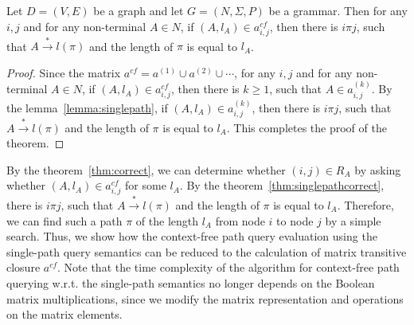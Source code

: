 \begin{mytheorem}\label{thm:singlepathcorrect}
	Let $D = (V,E)$ be a graph and let $G =(N,\Sigma,P)$ be a grammar. Then for any $i, j$ and for any non-terminal $A \in N$, if $(A, l_A) \in a^{cf}_{i,j}$, then there is $i \pi j$, such that $A \xrightarrow{*} l(\pi)$ and the length of $\pi$ is equal to $l_A$.
\end{mytheorem}
\begin{proof}
	
	Since the matrix $a^{cf} = a^{(1)} \cup a^{(2)} \cup \cdots$, for any $i, j$ and for any non-terminal $A \in N$, if $(A, l_A) \in a^{cf}_{i,j}$, then there is $k \geq 1$, such that $A \in a^{(k)}_{i,j}$. By the lemma~\ref{lemma:singlepath}, if $(A, l_A) \in a^{(k)}_{i,j}$, then there is $i \pi j$, such that $A \xrightarrow{*} l(\pi)$ and the length of $\pi$ is equal to $l_A$. This completes the proof of the theorem.
\end{proof}

By the theorem~\ref{thm:correct}, we can determine whether $(i,j) \in R_A$ by asking whether $(A, l_A) \in a^{cf}_{i,j}$ for some $l_A$. By the theorem~\ref{thm:singlepathcorrect}, there is $i \pi j$, such that $A \xrightarrow{*} l(\pi)$ and the length of $\pi$ is equal to $l_A$. Therefore, we can find such a path $\pi$ of the length $l_A$ from node $i$ to node $j$ by a simple search. Thus, we show how the context-free path query evaluation using the single-path query semantics can be reduced to the calculation of matrix transitive closure $a^{cf}$. Note that the time complexity of the algorithm for context-free path querying w.r.t. the single-path semantics no longer depends on the Boolean matrix multiplications, since we modify the matrix representation and operations on the matrix elements.
